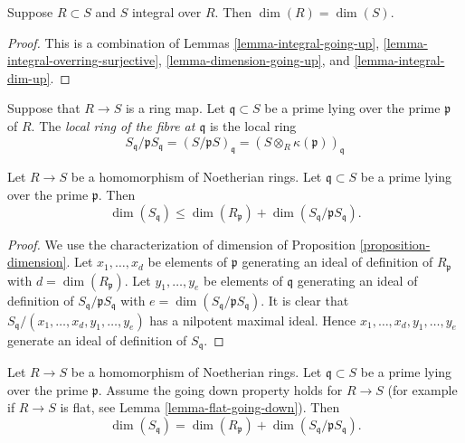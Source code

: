 \begin{lemma}
\label{lemma-integral-sub-dim-equal}
Suppose $R \subset S$ and $S$ integral over $R$.
Then $\dim(R) = \dim(S)$.
\end{lemma}

\begin{proof}
This is a combination of Lemmas
\ref{lemma-integral-going-up},
\ref{lemma-integral-overring-surjective},
\ref{lemma-dimension-going-up}, and
\ref{lemma-integral-dim-up}.
\end{proof}

\begin{definition}
\label{definition-fibre}
Suppose that $R \to S$ is a ring map.
Let $\mathfrak q \subset S$ be a prime lying
over the prime $\mathfrak p$ of $R$.
The {\it local ring of the fibre at $\mathfrak q$}
is the local ring
$$
S_{\mathfrak q}/\mathfrak pS_{\mathfrak q}
=
(S/\mathfrak pS)_{\mathfrak q}
=
(S \otimes_R \kappa(\mathfrak p))_{\mathfrak q}
$$
\end{definition}

\begin{lemma}
\label{lemma-dimension-base-fibre-total}
Let $R \to S$ be a homomorphism of Noetherian rings.
Let $\mathfrak q \subset S$ be a prime lying
over the prime $\mathfrak p$. Then
$$
\dim(S_{\mathfrak q})
\leq
\dim(R_{\mathfrak p})
+
\dim(S_{\mathfrak q}/\mathfrak pS_{\mathfrak q}).
$$
\end{lemma}

\begin{proof}
We use the characterization of dimension of
Proposition \ref{proposition-dimension}.
Let $x_1, \ldots, x_d$ be elements of $\mathfrak p$
generating an ideal of definition of $R_{\mathfrak p}$ with
$d = \dim(R_{\mathfrak p})$.
Let $y_1, \ldots, y_e$ be elements of $\mathfrak q$
generating an ideal of definition of
$S_{\mathfrak q}/\mathfrak pS_{\mathfrak q}$
with $e = \dim(S_{\mathfrak q}/\mathfrak pS_{\mathfrak q})$.
It is clear that $S_{\mathfrak q}/(x_1, \ldots, x_d, y_1, \ldots, y_e)$
has a nilpotent maximal ideal. Hence
$x_1, \ldots, x_d, y_1, \ldots, y_e$ generate an ideal of definition
of $S_{\mathfrak q}$.
\end{proof}

\begin{lemma}
\label{lemma-dimension-base-fibre-equals-total}
Let $R \to S$ be a homomorphism of Noetherian rings.
Let $\mathfrak q \subset S$ be a prime lying
over the prime $\mathfrak p$. Assume the going down property holds
for $R \to S$ (for example if $R \to S$ is flat, see
Lemma \ref{lemma-flat-going-down}). Then
$$
\dim(S_{\mathfrak q})
=
\dim(R_{\mathfrak p})
+
\dim(S_{\mathfrak q}/\mathfrak pS_{\mathfrak q}).
$$
\end{lemma}

